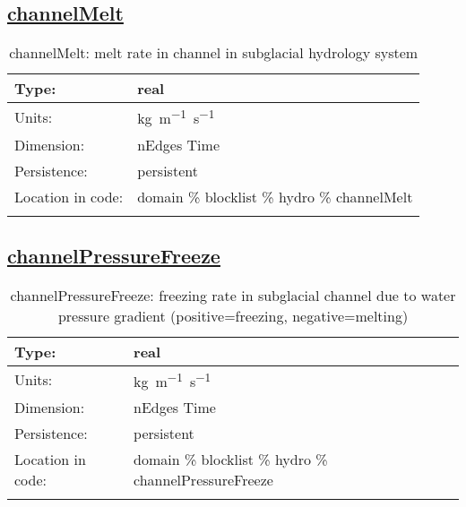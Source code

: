 \subsection[channelMelt]{\hyperref[sec:var_tab_hydro]{channelMelt}}
\label{subsec:var_sec_hydro_channelMelt}
\begin{center}
\begin{longtable}{| p{2.0in} | p{4.0in} |}
        \hline 
        Type: & real \\
        \hline 
        Units: & \si{kg.m^{-1}.s^{-1}} \\
        \hline 
        Dimension: & nEdges Time \\
        \hline 
        Persistence: & persistent \\
        \hline 
         Location in code: & domain \% blocklist \% hydro \% channelMelt \\
         \hline 
    \caption{channelMelt: melt rate in channel in subglacial hydrology system}
\end{longtable}
\end{center}
\subsection[channelPressureFreeze]{\hyperref[sec:var_tab_hydro]{channelPressureFreeze}}
\label{subsec:var_sec_hydro_channelPressureFreeze}
\begin{center}
\begin{longtable}{| p{2.0in} | p{4.0in} |}
        \hline 
        Type: & real \\
        \hline 
        Units: & \si{kg.m^{-1}.s^{-1}} \\
        \hline 
        Dimension: & nEdges Time \\
        \hline 
        Persistence: & persistent \\
        \hline 
         Location in code: & domain \% blocklist \% hydro \% channelPressureFreeze \\
         \hline 
    \caption{channelPressureFreeze: freezing rate in subglacial channel due to water pressure gradient (positive=freezing, negative=melting)}
\end{longtable}
\end{center}
